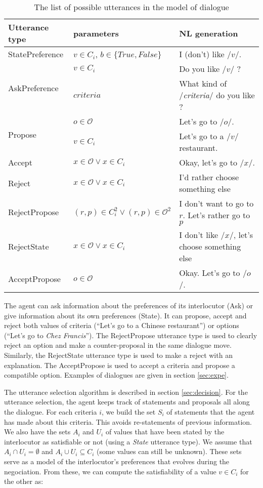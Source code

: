 \documentclass{llncs}
\begin{document}
		\begin{table}[h]
			\begin{tabular} {|p{2.5cm}|p{3.5cm}|p{6cm}|}
				\hline
				Utterance type & parameters & NL generation\\
				\hline
				StatePreference & $v \in C_i$, $b\in\{True,False\}$ & I (don't) like /$v$/.\\
				\hline
				 \multirow{2}{*}{AskPreference} &$v \in C_i$ & Do you like /$v$/ ?\\
				 \cline{2-3} & $criteria$ & What kind of /\emph{criteria}/ do you like ?\\
				 \hline
				 \multirow{2}{*}{Propose} & $o \in \mathcal{O}$ & Let's go to /$o$/.\\
				 \cline{2-3} & $v \in C_i$ & Let's go to a /$v$/ restaurant.\\
				 \hline
				 Accept& $x \in \mathcal{O} \vee x\in C_i$ & Okay, let's go to /$x$/.\\
				 \hline
				 Reject & $x \in \mathcal{O} \vee x\in C_i$ & I'd rather choose  something else \\
				 \hline
				 \hline
				 RejectPropose & $(r,p)\in C_i^2 \vee (r,p) \in \mathcal{O}^2 $ & I don't want to go to $r$. Let's rather go to $p$ \\
				 \hline 
				 RejectState & $x \in \mathcal{O} \vee x\in C_i$ &  I don't like /$x$/, let's choose something else \\
				 \hline
				 AcceptPropose & $o \in \mathcal{O}$ & Okay. Let's go to /$o$/.\\
				 \hline
			\end{tabular}
			\caption{The list of possible utterances in the model of dialogue}
		\end{table}
	
	The agent can ask information about the preferences of its interlocutor (Ask) or give information about its own preferences (State). It can propose, accept and reject both values of criteria (``Let's go to a Chinese restaurant'') or options (``Let's go to \emph{Chez Francis}''). The RejectPropose utterance type is used to clearly reject an option and make a counter-proposal in the same dialogue move. Similarly, the RejectState utterance type is used to make a reject with an explanation. The AcceptPropose is used to accept a criteria and propose a compatible option. Examples of dialogues are given in section \ref{sec:expe}.
	
	\medskip
	The utterance selection algorithm is described in section \ref{sec:decision}. For the utterance selection, the agent keeps track of statements and proposals all along the dialogue. For each criteria $i$, we build the set $S_i$ of statements that the agent has made about this criteria. This avoids re-statements of previous information. We also have the sets $A_i$ and $U_i$ of values that have been stated by the interlocutor as satisfiable or not (using a \emph{State} utterance type). We assume that $A_i\cap U_i=\emptyset$ and $A_i\cup U_i\subseteq C_i$ (some values can still be unknown). These sets serve as a model of the interlocutor's preferences that evolves during the negociation. From these, we can compute the satisfiability of a value $v\in C_i$ for the other as:
	
\end{document}
